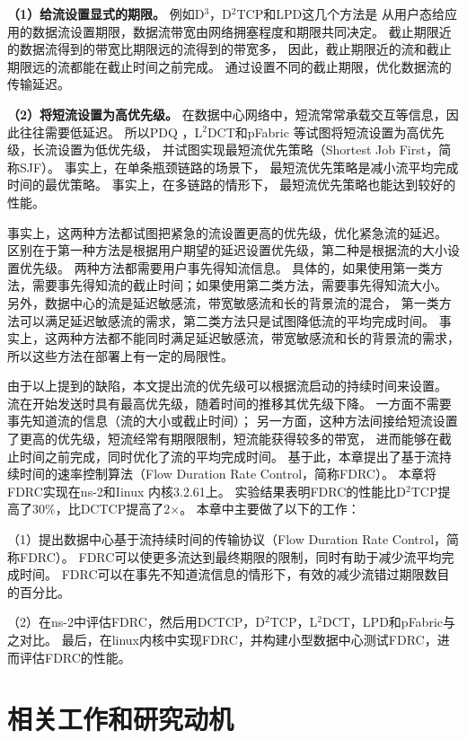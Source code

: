 \textbf{（1）给流设置显式的期限。} 
例如D$^3$\cite{D3}，D$^2$TCP\cite{D2TCP}和LPD\cite{LPD}这几个方法是
从用户态给应用的数据流设置期限，数据流带宽由网络拥塞程度和期限共同决定。
截止期限近的数据流得到的带宽比期限远的流得到的带宽多，
因此，截止期限近的流和截止期限远的流都能在截止时间之前完成。
通过设置不同的截止期限，优化数据流的传输延迟。

\textbf{（2）将短流设置为高优先级。}
在数据中心网络中，短流常常承载交互等信息，因此往往需要低延迟。
所以PDQ \cite{PDQ}，L$^2$DCT\cite{L2DCT}和pFabric \cite{pFabric}等试图将短流设置为高优先级，长流设置为低优先级，
并试图实现最短流优先策略（Shortest Job First，简称SJF）。
事实上，在单条瓶颈链路的场景下，
最短流优先策略是减小流平均完成时间的最优策略。
事实上，在多链路的情形下，
最短流优先策略也能达到较好的性能\cite{L2DCT,pFabric}。


事实上，这两种方法都试图把紧急的流设置更高的优先级，优化紧急流的延迟。
区别在于第一种方法是根据用户期望的延迟设置优先级，第二种是根据流的大小设置优先级。
两种方法都需要用户事先得知流信息。
具体的，如果使用第一类方法，需要事先得知流的截止时间；如果使用第二类方法，需要事先得知流大小。
另外，数据中心的流是延迟敏感流，带宽敏感流和长的背景流的混合，
第一类方法可以满足延迟敏感流的需求，第二类方法只是试图降低流的平均完成时间。
事实上，这两种方法都不能同时满足延迟敏感流，带宽敏感流和长的背景流的需求，
所以这些方法在部署上有一定的局限性。

由于以上提到的缺陷，本文提出流的优先级可以根据流启动的持续时间来设置。
流在开始发送时具有最高优先级，随着时间的推移其优先级下降。
 一方面不需要事先知道流的信息（流的大小或截止时间）；
另一方面，这种方法间接给短流设置了更高的优先级，短流经常有期限限制，短流能获得较多的带宽，
进而能够在截止时间之前完成，同时优化了流的平均完成时间。
基于此，本章提出了基于流持续时间的速率控制算法（Flow Duration Rate Control，简称FDRC）。
本章将FDRC实现在ns-2\cite{ns2}和Iinux 内核3.2.61上。
实验结果表明FDRC的性能比D$^2$TCP提高了$30\%$，比DCTCP提高了2$\times$。
本章中主要做了以下的工作：

（1）提出数据中心基于流持续时间的传输协议（Flow Duration Rate Control，简称FDRC）。
FDRC可以使更多流达到最终期限的限制，同时有助于减少流平均完成时间。
FDRC可以在事先不知道流信息的情形下，有效的减少流错过期限数目的百分比。

（2）在ns-2中评估FDRC，然后用DCTCP，D$^2$TCP，L$^2$DCT，LPD和pFabric与之对比。
最后，在linux内核中实现FDRC，并构建小型数据中心测试FDRC，进而评估FDRC的性能。


\section{相关工作和研究动机}
\label{FDRC:background}
